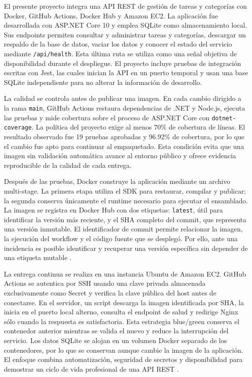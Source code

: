 \documentclass[12pt,a4paper]{report}
\begin{document}
El presente proyecto integra una API REST de gestión de tareas y categorías con Docker, GitHub Actions, Docker Hub y Amazon EC2. La aplicación fue desarrollada con ASP.NET Core 10 y emplea SQLite como almacenamiento local. Sus endpoints permiten consultar y administrar tareas y categorías, descargar un respaldo de la base de datos, vaciar los datos y conocer el estado del servicio mediante \texttt{/api/health}. Esta última ruta se utiliza como una señal objetiva de disponibilidad durante el despliegue. El proyecto incluye pruebas de integración escritas con Jest, las cuales inician la API en un puerto temporal y usan una base SQLite independiente para no alterar la información de desarrollo.

La calidad se controla antes de publicar una imagen. En cada cambio dirigido a la rama \texttt{main}, GitHub Actions restaura dependencias de .NET y Node.js, ejecuta las pruebas y mide cobertura sobre el proceso de ASP.NET Core con \texttt{dotnet-coverage}. La política del proyecto exige al menos 70\% de cobertura de líneas. El resultado observado fue 19 pruebas aprobadas y 96.92\% de cobertura, por lo que el cambio fue apto para continuar al empaquetado. Esta condición evita que una imagen sin validación automática avance al entorno público y ofrece evidencia reproducible de la calidad de cada entrega.

Después de las pruebas, Docker construye la aplicación mediante un archivo multi-stage. La primera etapa utiliza el SDK para restaurar, compilar y publicar; la segunda conserva únicamente el runtime necesario para ejecutar el ensamblado. La imagen se registra en Docker Hub con dos etiquetas: \texttt{latest}, útil para identificar la versión más reciente, y el SHA completo del commit, que representa una versión inmutable. El identificador de commit permite relacionar la imagen, la ejecución del workflow y el código fuente que se desplegó. Por ello, ante una incidencia es posible identificar y recuperar una versión específica sin depender de una etiqueta mutable \cite{docker}.

La entrega continua se realiza en una instancia Ubuntu de Amazon EC2. GitHub Actions se autentica por SSH usando una clave privada almacenada exclusivamente como Secret y verifica la clave pública del host antes de conectarse. En el servidor, un script descarga la imagen identificada por SHA, la inicia en el puerto local alterno, consulta el endpoint de salud y redirige Nginx sólo cuando la respuesta es satisfactoria. Esta estrategia blue/green conserva el contenedor anterior mientras se valida el nuevo y reduce la interrupción del servicio. Los datos SQLite se alojan en un volumen Docker separado de los contenedores, por lo que se conservan aunque cambie la imagen de la aplicación. El enfoque combina automatización, seguridad de secretos y disponibilidad para demostrar un ciclo de vida profesional de una API REST \cite{aws}.
\end{document}
